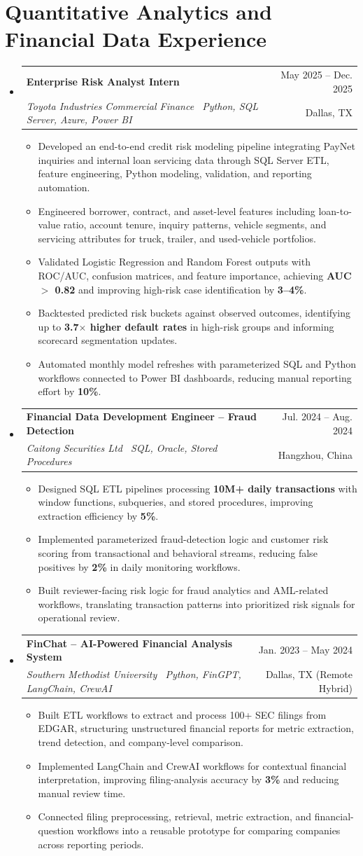 \documentclass[letterpaper,10pt]{article}
\makeatletter
\newcommand{\resumeItem}[1]{\item\footnotesize{#1\vspace{-2.5pt}}}
\newcommand{\resumeSubheading}[4]{
  \vspace{-2pt}\item
    \begin{tabular*}{0.985\textwidth}[t]{l@{\extracolsep{\fill}}r}
      \textbf{#1} & \small #2 \\
      \textit{\small #3} & \small #4 \\
    \end{tabular*}\vspace{-4pt}
}
\newcommand{\resumeSubHeadingListStart}{\begin{itemize}[leftmargin=0.11in,label={}]}
\newcommand{\resumeSubHeadingListEnd}{\end{itemize}\vspace{-2pt}}
\newcommand{\resumeItemListStart}{\begin{itemize}[leftmargin=0.17in,itemsep=0.6pt,topsep=1pt,label={$\bullet$}]}
\newcommand{\resumeItemListEnd}{\end{itemize}\vspace{1pt}}
\makeatother
\begin{document}
\section{Quantitative Analytics and Financial Data Experience}
\resumeSubHeadingListStart
\resumeSubheading{Enterprise Risk Analyst Intern}{May 2025 -- Dec. 2025}{Toyota Industries Commercial Finance \textbar\ Python, SQL Server, Azure, Power BI}{Dallas, TX}
\resumeItemListStart
\resumeItem{Developed an end-to-end credit risk modeling pipeline integrating PayNet inquiries and internal loan servicing data through SQL Server ETL, feature engineering, Python modeling, validation, and reporting automation.}
\resumeItem{Engineered borrower, contract, and asset-level features including loan-to-value ratio, account tenure, inquiry patterns, vehicle segments, and servicing attributes for truck, trailer, and used-vehicle portfolios.}
\resumeItem{Validated Logistic Regression and Random Forest outputs with ROC/AUC, confusion matrices, and feature importance, achieving \textbf{AUC $>$ 0.82} and improving high-risk case identification by \textbf{3--4\%}.}
\resumeItem{Backtested predicted risk buckets against observed outcomes, identifying up to \textbf{3.7$\times$ higher default rates} in high-risk groups and informing scorecard segmentation updates.}
\resumeItem{Automated monthly model refreshes with parameterized SQL and Python workflows connected to Power BI dashboards, reducing manual reporting effort by \textbf{10\%}.}
\resumeItemListEnd

\resumeSubheading{Financial Data Development Engineer -- Fraud Detection}{Jul. 2024 -- Aug. 2024}{Caitong Securities Ltd \textbar\ SQL, Oracle, Stored Procedures}{Hangzhou, China}
\resumeItemListStart
\resumeItem{Designed SQL ETL pipelines processing \textbf{10M+ daily transactions} with window functions, subqueries, and stored procedures, improving extraction efficiency by \textbf{5\%}.}
\resumeItem{Implemented parameterized fraud-detection logic and customer risk scoring from transactional and behavioral streams, reducing false positives by \textbf{2\%} in daily monitoring workflows.}
\resumeItem{Built reviewer-facing risk logic for fraud analytics and AML-related workflows, translating transaction patterns into prioritized risk signals for operational review.}
\resumeItemListEnd

\resumeSubheading{FinChat -- AI-Powered Financial Analysis System}{Jan. 2023 -- May 2024}{Southern Methodist University \textbar\ Python, FinGPT, LangChain, CrewAI}{Dallas, TX (Remote Hybrid)}
\resumeItemListStart
\resumeItem{Built ETL workflows to extract and process 100+ SEC filings from EDGAR, structuring unstructured financial reports for metric extraction, trend detection, and company-level comparison.}
\resumeItem{Implemented LangChain and CrewAI workflows for contextual financial interpretation, improving filing-analysis accuracy by \textbf{3\%} and reducing manual review time.}
\resumeItem{Connected filing preprocessing, retrieval, metric extraction, and financial-question workflows into a reusable prototype for comparing companies across reporting periods.}
\resumeItemListEnd
\resumeSubHeadingListEnd
\end{document}
